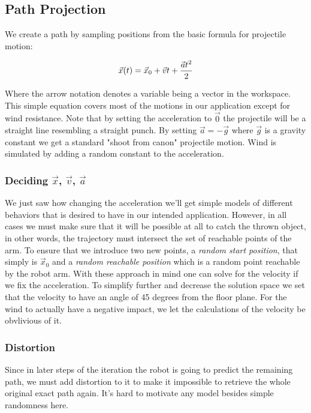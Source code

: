 \documentclass[letterpaper, 10 pt, conference]{ieeeconf}  %
\begin{document}
\subsection{Path Projection}

We create a path by sampling positions from the basic formula for projectile motion:

\[
  \vec{x}(t) = \vec{x}_0 + \vec{v}t + {\vec{a}t^2 \over 2}
\]

Where the arrow notation denotes a variable being a vector in the
workspace.  This simple equation covers most of the motions in our
application except for wind resistance. Note that by setting the
acceleration to $\vec{0}$ the projectile will be a straight line
resembling a straight punch. By setting $\vec{a} = -\vec{g}$ where
$\vec{g}$ is a gravity constant we get a standard "shoot from canon"
projectile motion. Wind is simulated by adding a random constant to
the acceleration.

\subsubsection{Deciding $\vec{x}$, $\vec{v}$, $\vec{a}$}

We just saw how changing the acceleration we'll get simple models of
different behaviors that is desired to have in our intended application.
However, in all cases we must make sure that it will be possible at all
to catch the thrown object, in other words, the trajectory must
intersect the set of reachable points of the arm. To ensure that we
introduce two new points, a \emph{random start position}, that simply is
$\vec{x}_0$ and a \emph{random reachable position} which is a random
point reachable by the robot arm. With these approach in mind one can
solve for the velocity if we fix the acceleration. To simplify further
and decrease the solution space we set that the velocity to have an
angle of 45 degrees from the floor plane. For the wind to actually have
a negative impact, we let the calculations of the velocity be obvlivious
of it.

\subsubsection{Distortion}

Since in later steps of the iteration the robot is going to predict the
remaining path, we must add distortion to it to make it impossible to
retrieve the whole original exact path again. It's hard to motivate
any model besides simple randomness here.
\end{document}
